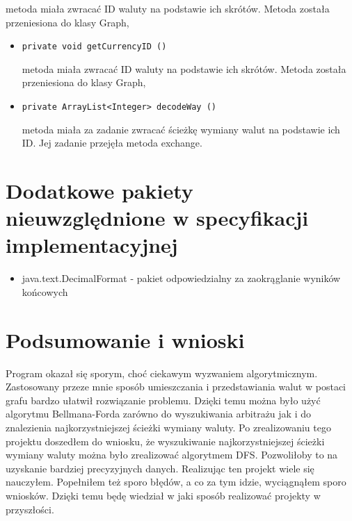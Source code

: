 \documentclass[12pt]{article}
\begin{document}
\begin{enumerate}
\begin{itemize}
        metoda miała zwracać ID waluty na podstawie ich skrótów. Metoda została przeniesiona do klasy Graph,
    \end{itemize}
    \begin{itemize}
     \item \begin{verbatim}private void getCurrencyID ()\end{verbatim}
        metoda miała zwracać ID waluty na podstawie ich skrótów. Metoda została przeniesiona do klasy Graph,
    \end{itemize}
    \begin{itemize}
     \item \begin{verbatim}private ArrayList<Integer> decodeWay ()\end{verbatim}
        metoda miała za zadanie zwracać ścieżkę wymiany walut na podstawie ich ID. Jej zadanie przejęła metoda exchange.
    \end{itemize}
\end{enumerate}

\section{Dodatkowe pakiety nieuwzględnione w specyfikacji implementacyjnej}
\begin{itemize}
\item java.text.DecimalFormat - pakiet odpowiedzialny za zaokrąglanie wyników końcowych
\end{itemize}

\section{Podsumowanie i wnioski}
Program okazał się sporym, choć ciekawym wyzwaniem algorytmicznym. Zastosowany przeze mnie sposób umieszczania i przedstawiania walut w postaci grafu bardzo ułatwił rozwiązanie problemu. Dzięki temu można było użyć algorytmu Bellmana-Forda zarówno do wyszukiwania arbitrażu jak i do znalezienia najkorzystniejszej ścieżki wymiany waluty.
\newline\newline
Po zrealizowaniu tego projektu doszedłem do wniosku, że wyszukiwanie najkorzystniejszej ścieżki wymiany waluty można było zrealizować algorytmem DFS. Pozwoliłoby to na uzyskanie bardziej precyzyjnych danych.
\newline\newline
Realizując ten projekt wiele się nauczyłem. Popełniłem też sporo błędów, a co za tym idzie, wyciągnąłem sporo wniosków. Dzięki temu będę wiedział w jaki sposób realizować projekty w przyszłości.
\end{document}
